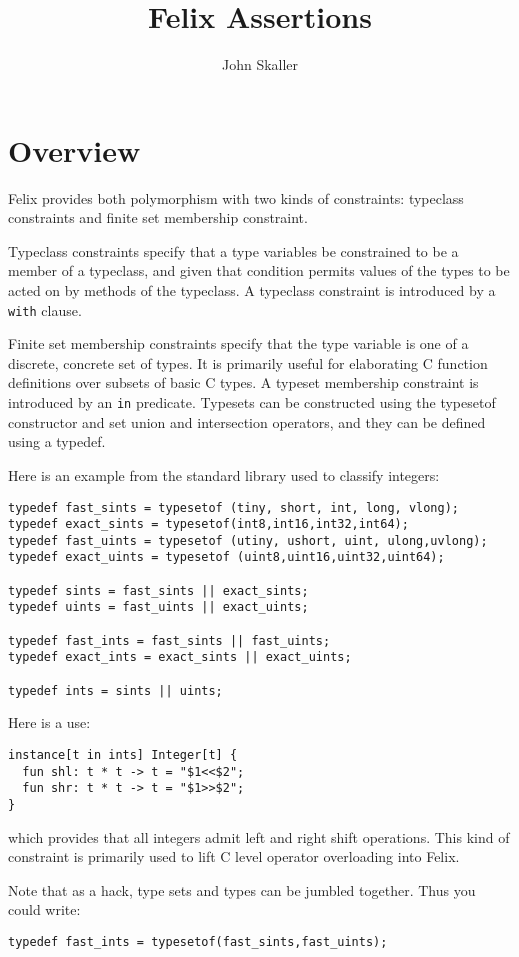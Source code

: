 \documentclass{report}
\title{Felix Assertions}
\author{John Skaller}
\begin{document}
\maketitle
\tableofcontents

\chapter{Overview}
Felix provides both polymorphism with two kinds of constraints: typeclass constraints
and finite set membership constraint.

Typeclass constraints specify that a type variables be constrained to be a member
of a typeclass, and given that condition permits values of the types 
to be acted on by methods of the typeclass. A typeclass constraint is
introduced by a {\tt with} clause. 

Finite set membership constraints specify that the type variable is 
one of a discrete, concrete set of types. It is primarily useful
for elaborating C function definitions over subsets of basic C types.
A typeset membership constraint is introduced by an {\tt in} predicate.
Typesets can be constructed using the typesetof constructor and
set union and intersection operators, and they can be defined 
using a typedef.

Here is an example from the standard library used to
classify integers:

\begin{verbatim}
typedef fast_sints = typesetof (tiny, short, int, long, vlong);
typedef exact_sints = typesetof(int8,int16,int32,int64);
typedef fast_uints = typesetof (utiny, ushort, uint, ulong,uvlong);
typedef exact_uints = typesetof (uint8,uint16,uint32,uint64);

typedef sints = fast_sints || exact_sints;
typedef uints = fast_uints || exact_uints;

typedef fast_ints = fast_sints || fast_uints;
typedef exact_ints = exact_sints || exact_uints;

typedef ints = sints || uints;
\end{verbatim}

Here is a use:
\begin{verbatim}
instance[t in ints] Integer[t] {
  fun shl: t * t -> t = "$1<<$2";
  fun shr: t * t -> t = "$1>>$2";
}
\end{verbatim}
which provides that all integers admit left
and right shift operations. This kind of constraint
is primarily used to lift C level operator overloading
into Felix.

Note that as a hack, type sets and types can be jumbled
together. Thus you could write:
\begin{verbatim}
typedef fast_ints = typesetof(fast_sints,fast_uints);
\end{verbatim}
\end{document}
